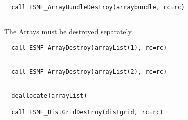  \begin{verbatim}
  call ESMF_ArrayBundleDestroy(arraybundle, rc=rc)
 
\end{verbatim}
 

   The Arrays must be destroyed separately. 

 \begin{verbatim}
  call ESMF_ArrayDestroy(arrayList(1), rc=rc)
 
\end{verbatim}
 

 \begin{verbatim}
  call ESMF_ArrayDestroy(arrayList(2), rc=rc)
 
\end{verbatim}
 

 \begin{verbatim}
  deallocate(arrayList)
  
  call ESMF_DistGridDestroy(distgrid, rc=rc)
 
\end{verbatim}

\setlength{\parskip}{\oldparskip}
\setlength{\parindent}{\oldparindent}
\setlength{\baselineskip}{\oldbaselineskip}
